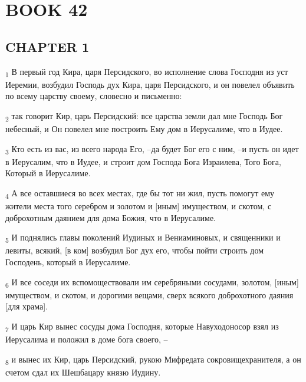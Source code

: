 \section{BOOK 42}
\subsection{CHAPTER 1}
\begin{tcolorbox}
\textsubscript{1} В первый год Кира, царя Персидского, во исполнение слова Господня из уст Иеремии, возбудил Господь дух Кира, царя Персидского, и он повелел объявить по всему царству своему, словесно и письменно:
\end{tcolorbox}
\begin{tcolorbox}
\textsubscript{2} так говорит Кир, царь Персидский: все царства земли дал мне Господь Бог небесный, и Он повелел мне построить Ему дом в Иерусалиме, что в Иудее.
\end{tcolorbox}
\begin{tcolorbox}
\textsubscript{3} Кто есть из вас, из всего народа Его, --да будет Бог его с ним, --и пусть он идет в Иерусалим, что в Иудее, и строит дом Господа Бога Израилева, Того Бога, Который в Иерусалиме.
\end{tcolorbox}
\begin{tcolorbox}
\textsubscript{4} А все оставшиеся во всех местах, где бы тот ни жил, пусть помогут ему жители места того серебром и золотом и [иным] имуществом, и скотом, с доброхотным даянием для дома Божия, что в Иерусалиме.
\end{tcolorbox}
\begin{tcolorbox}
\textsubscript{5} И поднялись главы поколений Иудиных и Вениаминовых, и священники и левиты, всякий, [в ком] возбудил Бог дух его, чтобы пойти строить дом Господень, который в Иерусалиме.
\end{tcolorbox}
\begin{tcolorbox}
\textsubscript{6} И все соседи их вспомоществовали им серебряными сосудами, золотом, [иным] имуществом, и скотом, и дорогими вещами, сверх всякого доброхотного даяния [для храма].
\end{tcolorbox}
\begin{tcolorbox}
\textsubscript{7} И царь Кир вынес сосуды дома Господня, которые Навуходоносор взял из Иерусалима и положил в доме бога своего, --
\end{tcolorbox}
\begin{tcolorbox}
\textsubscript{8} и вынес их Кир, царь Персидский, рукою Мифредата сокровищехранителя, а он счетом сдал их Шешбацару князю Иудину.
\end{tcolorbox}
